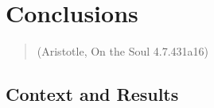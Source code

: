 \chapter{Conclusions}
\label{chapter7}
\thispagestyle{empty}


\begin{quotation}
{\footnotesize
{}
\begin{flushright}
 (Aristotle, On the Soul 4.7.431a16)
\end{flushright}
}
\end{quotation}

\vspace{2cm}


\section{Context and Results}

